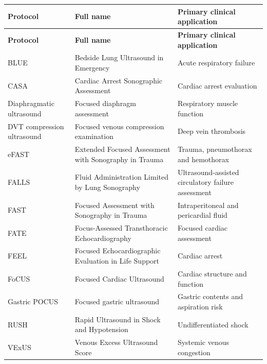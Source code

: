 \begin{longtable}{@{}p{}p{}p{}@{}}
\toprule
\textbf{Protocol} & \textbf{Full name} & \textbf{Primary clinical application} \\
\midrule
\endfirsthead
\toprule
\textbf{Protocol} & \textbf{Full name} & \textbf{Primary clinical application} \\
\midrule
\endhead
BLUE & Bedside Lung Ultrasound in Emergency & Acute respiratory failure \\
CASA & Cardiac Arrest Sonographic Assessment & Cardiac arrest evaluation \\
Diaphragmatic ultrasound & Focused diaphragm assessment & Respiratory muscle function \\
DVT compression ultrasound & Focused venous compression examination & Deep vein thrombosis \\
eFAST & Extended Focused Assessment with Sonography in Trauma & Trauma, pneumothorax and hemothorax \\
FALLS & Fluid Administration Limited by Lung Sonography & Ultrasound-assisted circulatory failure assessment \\
FAST & Focused Assessment with Sonography in Trauma & Intraperitoneal and pericardial fluid \\
FATE & Focus-Assessed Transthoracic Echocardiography & Focused cardiac assessment \\
FEEL & Focused Echocardiographic Evaluation in Life Support & Cardiac arrest \\
FoCUS & Focused Cardiac Ultrasound & Cardiac structure and function \\
Gastric POCUS & Focused gastric ultrasound & Gastric contents and aspiration risk \\
RUSH & Rapid Ultrasound in Shock and Hypotension & Undifferentiated shock \\
VExUS & Venous Excess Ultrasound Score & Systemic venous congestion \\
\bottomrule
\end{longtable}

